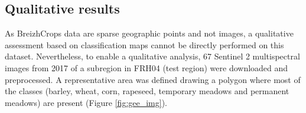 \documentclass[journal,article,submit,pdftex,moreauthors]{Definitions/mdpi}
\begin{document}
\subsection{Qualitative results}

As BreizhCrops data are sparse geographic points and not images, a qualitative assessment based on classification maps cannot be directly performed on this dataset. 
Nevertheless, to enable a qualitative analysis, 67 Sentinel 2 multispectral images from 2017 of a subregion in FRH04 (test region) were downloaded and preprocessed. 
A representative area was defined drawing a polygon where most of the classes (barley, wheat, corn, rapeseed, temporary meadows and permanent meadows) are present (Figure \ref{fig:gee_img}). 
\end{document}
